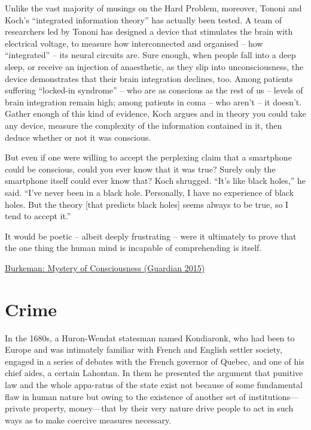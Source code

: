 \documentclass[
]{book}
\begin{document}
Unlike the vast majority of musings on the Hard Problem, moreover, Tononi and Koch's ``integrated information theory'' has actually been tested. A team of researchers led by Tononi has designed a device that stimulates the brain with electrical voltage, to measure how interconnected and organised -- how ``integrated'' -- its neural circuits are. Sure enough, when people fall into a deep sleep, or receive an injection of anaesthetic, as they slip into unconsciousness, the device demonstrates that their brain integration declines, too. Among patients suffering ``locked-in syndrome'' -- who are as conscious as the rest of us -- levels of brain integration remain high; among patients in coma -- who aren't -- it doesn't. Gather enough of this kind of evidence, Koch argues and in theory you could take any device, measure the complexity of the information contained in it, then deduce whether or not it was conscious.

But even if one were willing to accept the perplexing claim that a smartphone could be conscious, could you ever know that it was true? Surely only the smartphone itself could ever know that? Koch shrugged. ``It's like black holes,'' he said. ``I've never been in a black hole. Personally, I have no experience of black holes. But the theory {[}that predicts black holes{]} seems always to be true, so I tend to accept it.''

It would be poetic -- albeit deeply frustrating -- were it ultimately to prove that the one thing the human mind is incapable of comprehending is itself.

\href{https://www.theguardian.com/science/2015/jan/21/-sp-why-cant-worlds-greatest-minds-solve-mystery-consciousness}{Burkeman: Mystery of Consciousness (Guardian 2015)}

\hypertarget{crime}{%
\chapter{Crime}\label{crime}}

In the 1680s, a Huron-Wendat statesman named Kondiaronk, who had been to Europe and was intimately familiar with French and English settler society, engaged in a series of debates with the French governor of Quebec, and one of his chief aides, a certain Lahontan. In them he presented the argument that punitive law and the whole appa-ratus of the state exist not because of some fundamental flaw in human nature but owing to the existence of another set of institutions---private property, money---that by their very nature drive people to act in such ways as to make coercive measures necessary.
\end{document}
